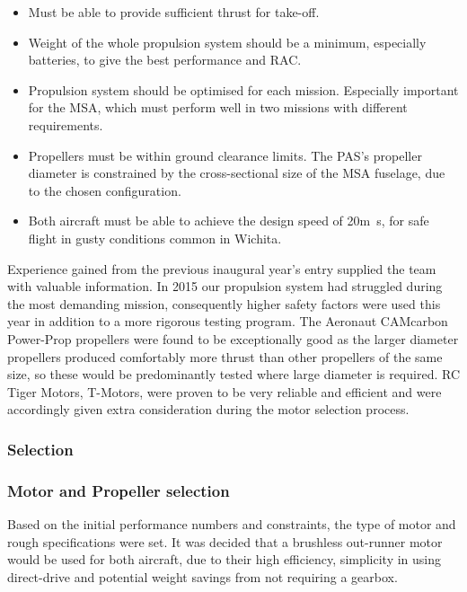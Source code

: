 \begin{itemize}
    \item Must be able to provide sufficient thrust for take-off.
    \item Weight of the whole propulsion system should be a minimum, especially batteries, to give the best performance and RAC.
    \item Propulsion system should be optimised for each mission. Especially important for the MSA, which must perform well in two missions with different requirements.
    \item Propellers must be within ground clearance limits. The PAS’s propeller diameter is constrained by the cross-sectional size of the MSA fuselage, due to the chosen configuration.
    \item Both aircraft must be able to achieve the design speed of 20\si{\meter\second}, for safe flight in gusty conditions common in Wichita.
\end{itemize}

Experience gained from the previous inaugural year’s entry supplied the team with valuable information. In 2015 our propulsion system had struggled during the most demanding mission, consequently  higher safety factors were used this year in addition to a more rigorous testing program. The Aeronaut CAMcarbon Power-Prop propellers were found to be exceptionally good as the larger diameter propellers produced comfortably more thrust than other propellers of the same size, so these would be predominantly tested where large diameter is required. RC Tiger Motors, T-Motors, were proven to be very reliable and efficient and were accordingly given extra consideration during the motor selection process.


\subsubsection{Selection}
\subsubsection{Motor and Propeller selection}

Based on the initial performance numbers and constraints, the type of motor and rough specifications were set. It was decided that a brushless out-runner motor would be used for both aircraft, due to their high efficiency, simplicity in using direct-drive and potential weight savings from not requiring a gearbox. 

